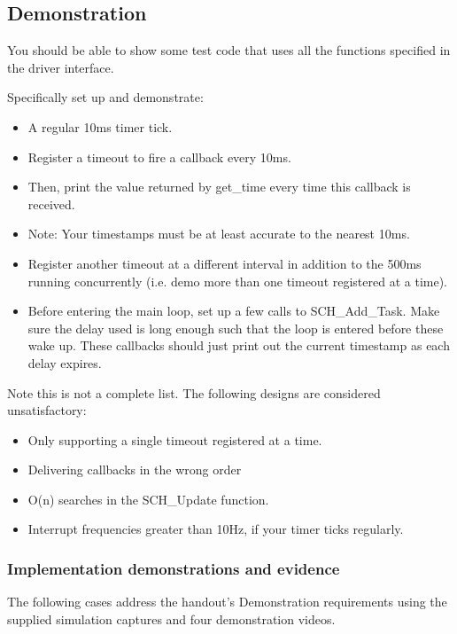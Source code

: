 \subsection{Demonstration}

You should be able to show some test code that uses all the functions specified in the driver interface.

Specifically set up and demonstrate:
\begin{itemize}
    \item A regular 10ms timer tick. 
    \item Register a timeout to fire a callback every 10ms.     
    \item Then, print the value returned by get\_time every time this callback is received. 
     \item Note: Your timestamps must be at least accurate to the nearest 10ms.
     \item Register another timeout at a different interval in addition to the 500ms running concurrently (i.e. demo more than one timeout registered at a time).
     \item Before entering the main loop, set up a few calls to SCH\_Add\_Task. Make sure the delay used is long enough such that the loop is entered before these wake up. These callbacks should just print out the current timestamp as each delay expires.

\end{itemize}




Note this is not a complete list. The following designs are considered unsatisfactory:
\begin{itemize}
    \item Only supporting a single timeout registered at a time.
    \item Delivering callbacks in the wrong order
    \item O(n) searches in the SCH\_Update function.
    \item Interrupt frequencies greater than 10Hz, if your timer ticks regularly.
\end{itemize}





\subsubsection{Implementation demonstrations and evidence}
The following cases address the handout's Demonstration requirements using the supplied simulation captures and four demonstration videos.


